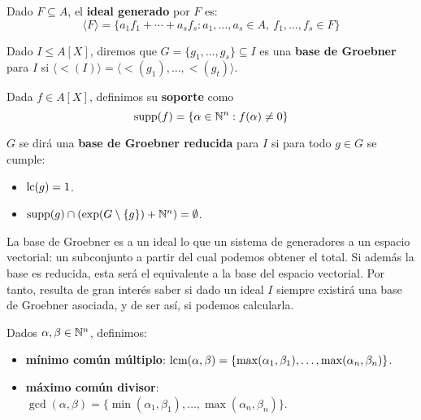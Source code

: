 \begin{definicion}
    Dado $F\subseteq A$, el \textbf{ideal generado} por $F$ es:
    \begin{equation*}
        \langle F \rangle = \{a_1f_1 + \cdots + a_sf_s : a_1,\dots, a_s\in A,\ f_1,\dots, f_s\in F\}
    \end{equation*}
\end{definicion}

\begin{definicion}
    Dado $I\le A[X]$, diremos que $G = \{g_1,\dots, g_s\}\subseteq I$ es una \textbf{base de Groebner} para $I$ si $\langle \lt(I)\rangle = \langle \lt(g_1),\dots, \lt(g_t) \rangle$.
\end{definicion}

\begin{definicion}
    Dada $f\in A[X]$, definimos su \textbf{soporte} como $$\text{supp}(f) = \{ \alpha\in\mathbb{N}^n : f(\alpha) \neq 0\}$$
\end{definicion}

\begin{definicion}
    $G$ se dirá una \textbf{base de Groebner reducida} para $I$ si para todo $g\in G$ se cumple:
    \begin{itemize}
        \item $\text{lc}(g)=1$.
        \item $\text{supp}(g) \cap \left(\exp(G\setminus\{g\}) + \mathbb{N}^n \right) = \emptyset$.
    \end{itemize}
\end{definicion}

La base de Groebner es a un ideal lo que un sistema de generadores a un espacio vectorial: un subconjunto a partir del cual podemos obtener el total. Si además la base es reducida, esta será el equivalente a la base del espacio vectorial. Por tanto, resulta de gran interés saber si dado un ideal $I$ siempre existirá una base de Groebner asociada, y de ser así, si podemos calcularla.

\begin{definicion}
    Dados $\alpha,\beta \in \mathbb{N}^n$, definimos:
    \begin{itemize}
        \item \textbf{mínimo común múltiplo}: $\text{lcm}(\alpha,\beta) = \{\max(\alpha_1, \beta_1),\dots, \max(\alpha_n, \beta_n)\}$.
        \item \textbf{máximo común divisor}: $\gcd(\alpha,\beta) = \{\min(\alpha_1, \beta_1),\dots, \max(\alpha_n, \beta_n)\}$.
    \end{itemize}
\end{definicion}

